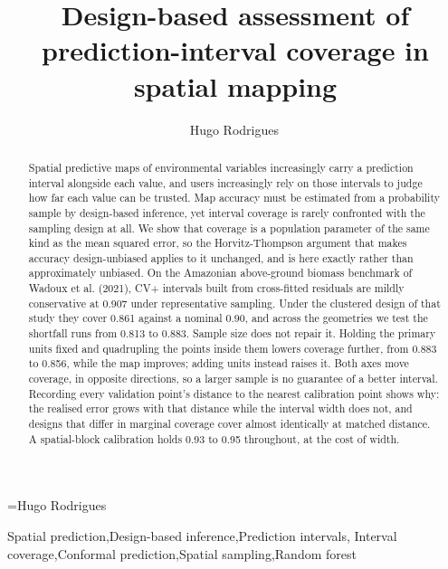 \documentclass[preprint,12pt,authoryear]{elsarticle}
\begin{document}
\begin{frontmatter}

\title{Design-based assessment of prediction-interval coverage in spatial
mapping}

\author{Hugo Rodrigues\,}
\makeatletter\@eadauthor={Hugo Rodrigues}\makeatother
{}

\address{University of Florida, Range Cattle Research and Education
Center, 3401 Experiment Station, Ona, FL 33865, USA}


\begin{abstract}
Spatial predictive maps of environmental variables increasingly carry a
prediction interval alongside each value, and users increasingly rely on those
intervals to judge how far each value can be trusted. Map accuracy must be estimated from a probability sample by
design-based inference, yet interval coverage is rarely confronted with the
sampling design at all. We show that coverage is a
population parameter of the same kind as the mean squared error, so the
Horvitz-Thompson argument that makes accuracy design-unbiased applies to it
unchanged, and is here exactly rather than approximately unbiased. On the
Amazonian above-ground biomass benchmark of Wadoux et al. (2021), CV+ intervals
built from cross-fitted residuals are mildly conservative at 0.907 under
representative sampling. Under the clustered design of that study they cover
0.861 against a nominal 0.90, and across the geometries we test the shortfall
runs from 0.813 to 0.883. Sample size does not repair it. Holding the primary
units fixed and quadrupling the points inside them lowers coverage further, from
0.883 to 0.856, while the map improves; adding units instead raises it. Both
axes move coverage, in opposite directions, so a larger sample is no guarantee
of a better interval. Recording every
validation point's distance to the nearest calibration point shows why: the
realised error grows with that distance while the interval width does not, and
designs that differ in marginal coverage cover almost identically at matched
distance. A spatial-block calibration holds 0.93 to 0.95 throughout, at the cost
of width.
\end{abstract}

\begin{keyword}
Spatial prediction\sep Design-based inference\sep Prediction intervals\sep
Interval coverage\sep Conformal prediction\sep Spatial sampling\sep Random forest
\end{keyword}

\end{frontmatter}
\end{document}
